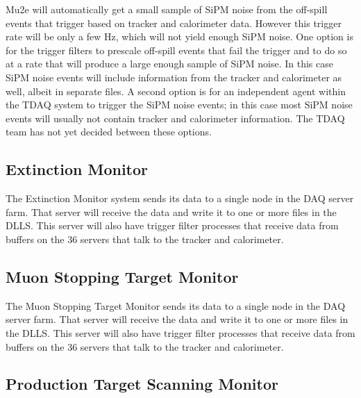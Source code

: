 Mu2e will automatically get a small sample of SiPM noise from the off-spill events
that trigger based on tracker and calorimeter data.
However this trigger rate will be only a few Hz, which will not yield enough SiPM noise.
One option is for the trigger filters to prescale off-spill events that fail the trigger
and to do so at a rate that will produce a large enough sample of SiPM noise.
In this case SiPM noise events will include information from the tracker and calorimeter as well,
albeit in separate files.
A second option is for an independent agent within the TDAQ system to trigger the SiPM noise events;
in this case most SiPM noise events will usually not contain tracker and calorimeter information.
The TDAQ team has not yet decided between these options.


\subsection{Extinction Monitor}
\label{ssec:ExtMon}

The Extinction Monitor system sends its data to a single node in the DAQ server farm.
That server will receive the data and write it to one or more files in
the DLLS.  This server will also have trigger filter processes that receive
data from buffers on the 36 servers that talk to the tracker and calorimeter.


\subsection{Muon Stopping Target Monitor}
\label{ssec:ExtMon}

The Muon Stopping Target Monitor sends its data to a single node in the DAQ server farm.
That server will receive the data and write it to one or more files in
the DLLS.  This server will also have trigger filter processes that receive
data from buffers on the 36 servers that talk to the tracker and calorimeter.

\subsection{Production Target Scanning Monitor}

